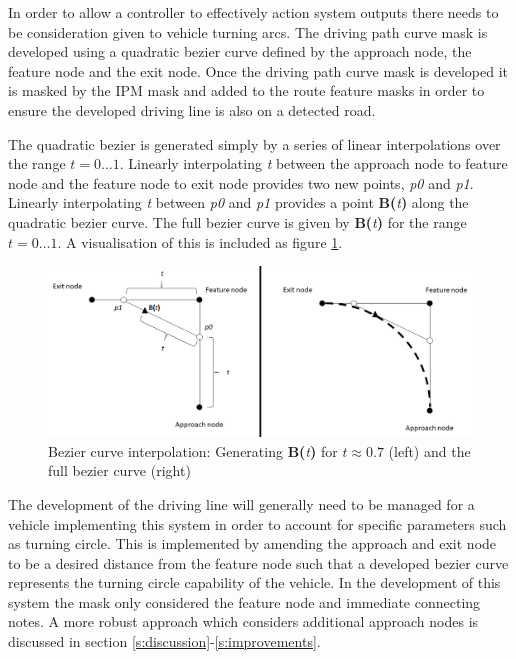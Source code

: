\documentclass[]{aiaa-tc}%
\begin{document}
In order to allow a controller to effectively action system outputs there needs to be consideration given to vehicle turning arcs. The driving path curve mask is developed using a quadratic bezier curve defined by the approach node, the feature node and the exit node. Once the driving path curve mask is developed it is masked by the IPM mask and added to the route feature masks in order to ensure the developed driving line is also on a detected road. 

The quadratic bezier is generated simply by a series of linear interpolations over the range $t=0...1$. Linearly interpolating \textit{t} between the approach node to feature node and the feature node to exit node provides two new points, \textit{p0} and \textit{p1}. Linearly interpolating \textit{t} between \textit{p0} and \textit{p1} provides a point \textbf{B(}\textit{t}\textbf{)} along the quadratic bezier curve. The full bezier curve is given by \textbf{B(}\textit{t}\textbf{)} for the range $t=0...1$. A visualisation of this is included as figure \ref{f:quadraticBezier}.

\begin{figure}
	\centering
	\includegraphics[width=1\textwidth]{bezier/quadraticBezier.png}
	\caption{Bezier curve interpolation: Generating \textbf{B(}\textit{t}\textbf{)} for $t\approx0.7$ (left) and the full bezier curve (right)}
	\label{f:quadraticBezier}
\end{figure}

The development of the driving line will generally need to be managed for a vehicle implementing this system in order to account for specific parameters such as turning circle. This is implemented by amending the approach and exit node to be a desired distance from the feature node such that a developed bezier curve represents the turning circle capability of the vehicle. In the development of this system the mask only considered the feature node and immediate connecting notes. A more robust approach which considers additional approach nodes is discussed in section \ref{s:discussion}-\ref{s:improvements}.
\end{document}
